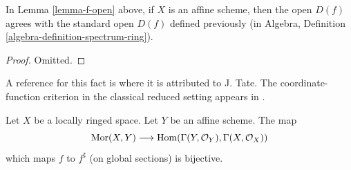 \begin{lemma}
\label{lemma-f-open-affine}
In Lemma \ref{lemma-f-open} above, if $X$ is an affine scheme,
then the open $D(f)$ agrees with the standard open $D(f)$
defined previously (in
Algebra, Definition \ref{algebra-definition-spectrum-ring}).
\end{lemma}

\begin{proof}
Omitted.
\end{proof}

\begin{lemma}
\label{lemma-morphism-into-affine}
\begin{reference}
A reference for this fact is \cite[II, Err 1, Prop. 1.8.1]{EGA}
where it is attributed to J. Tate.
The coordinate-function criterion in the classical reduced setting
appears in \cite[Chapter II, \S 1, no. 32, Proposition 5, p. 225]{FAC}.
\end{reference}
Let $X$ be a locally ringed space.
Let $Y$ be an affine scheme.
The map
$$
\mathop{\mathrm{Mor}}\nolimits(X, Y)
\longrightarrow
\mathop{\mathrm{Hom}}\nolimits(\Gamma(Y, \mathcal{O}_Y), \Gamma(X, \mathcal{O}_X))
$$
which maps $f$ to $f^\sharp$ (on global sections) is bijective.
\end{lemma}

